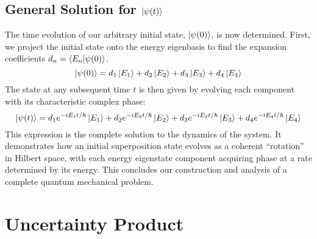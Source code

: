 \documentclass[11pt,a4paper]{article}
\begin{document}
\subsection{General Solution for \texorpdfstring{$\ket{\psi(t)}$}{psi(t)}}

The time evolution of our arbitrary initial state, $\ket{\psi(0)}$, is now
determined. First, we project the initial state onto the energy eigenbasis to
find the expansion coefficients $d_n = \braket{E_n}{\psi(0)}$.
$$
\ket{\psi(0)} = d_1\ket{E_1} + d_2\ket{E_2} + d_3\ket{E_3} + d_4\ket{E_4}
$$
The state at any subsequent time $t$ is then given by evolving each component
with its characteristic complex phase:
$$
\ket{\psi(t)} = d_1 e^{-iE_1 t/\hbar}\ket{E_1} + d_2 e^{-iE_2 t/\hbar}\ket{E_2} + d_3 e^{-iE_3 t/\hbar}\ket{E_3} + d_4 e^{-iE_4 t/\hbar}\ket{E_4}
$$
This expression is the complete solution to the dynamics of the system. It
demonstrates how an initial superposition state evolves as a coherent
``rotation'' in Hilbert space, with each energy eigenstate component acquiring
phase at a rate determined by its energy. This concludes our construction and
analysis of a complete quantum mechanical problem.

\section{Uncertainty Product}
\end{document}
